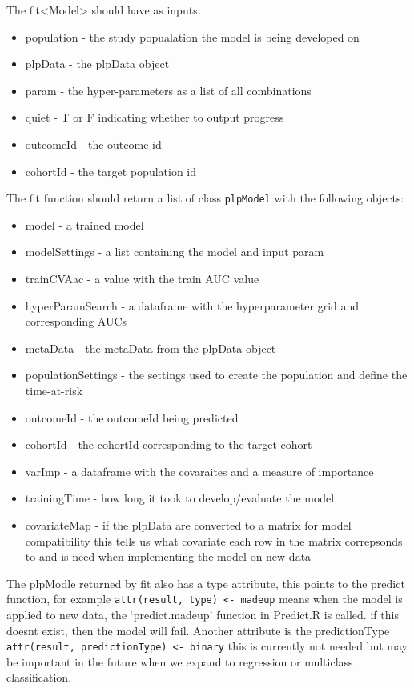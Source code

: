 \documentclass[]{article}
\providecommand{\tightlist}{%
  \setlength{\itemsep}{0pt}\setlength{\parskip}{0pt}}
\begin{document}
The fit\textless{}Model\textgreater{} should have as inputs:

\begin{itemize}
\tightlist
\item
  population - the study popualation the model is being developed on
\item
  plpData - the plpData object
\item
  param - the hyper-parameters as a list of all combinations
\item
  quiet - T or F indicating whether to output progress
\item
  outcomeId - the outcome id
\item
  cohortId - the target population id
\end{itemize}

The fit function should return a list of class \texttt{plpModel} with
the following objects:

\begin{itemize}
\tightlist
\item
  model - a trained model
\item
  modelSettings - a list containing the model and input param
\item
  trainCVAac - a value with the train AUC value
\item
  hyperParamSearch - a dataframe with the hyperparameter grid and
  corresponding AUCs
\item
  metaData - the metaData from the plpData object
\item
  populationSettings - the settings used to create the population and
  define the time-at-risk
\item
  outcomeId - the outcomeId being predicted
\item
  cohortId - the cohortId corresponding to the target cohort
\item
  varImp - a dataframe with the covaraites and a measure of importance
\item
  trainingTime - how long it took to develop/evaluate the model
\item
  covariateMap - if the plpData are converted to a matrix for model
  compatibility this tells us what covariate each row in the matrix
  correpsonds to and is need when implementing the model on new data
\end{itemize}

The plpModle returned by fit also has a type attribute, this points to
the predict function, for example
\texttt{attr(result,\ \textquotesingle{}type\textquotesingle{})\ \textless{}-\ \textquotesingle{}madeup\textquotesingle{}}
means when the model is applied to new data, the `predict.madeup'
function in Predict.R is called. if this doesnt exist, then the model
will fail. Another attribute is the predictionType
\texttt{attr(result,\ \textquotesingle{}predictionType\textquotesingle{})\ \textless{}-\ \textquotesingle{}binary\textquotesingle{}}
this is currently not needed but may be important in the future when we
expand to regression or multiclass classification.
\end{document}
